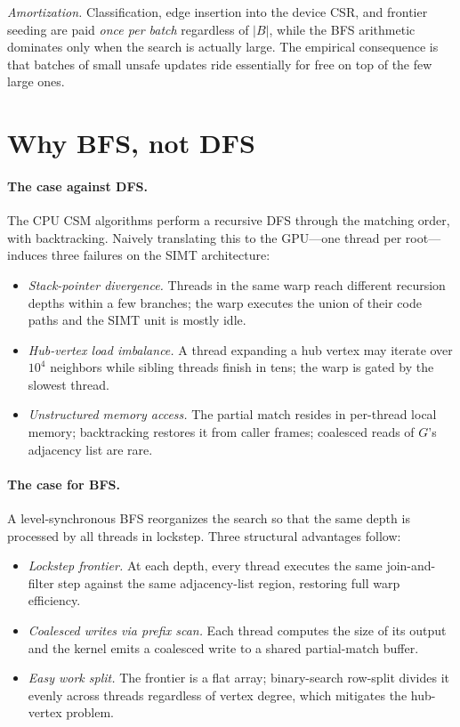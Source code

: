 \documentclass[sigconf,nonacm]{acmart}
\theoremstyle{definition}
\begin{document}
\noindent\emph{Amortization.} Classification, edge insertion into the device CSR, and frontier seeding are paid \emph{once per batch} regardless of $|B|$, while the BFS arithmetic dominates only when the search is actually large. The empirical consequence is that batches of small unsafe updates ride essentially for free on top of the few large ones.

\section{Why BFS, not DFS}
\label{sec:bfs-vs-dfs}

\paragraph{The case against DFS.}
The CPU CSM algorithms perform a recursive DFS through the matching order, with backtracking. Naively translating this to the GPU---one thread per root---induces three failures on the SIMT architecture:

\begin{itemize}
    \item \emph{Stack-pointer divergence.} Threads in the same warp reach different recursion depths within a few branches; the warp executes the union of their code paths and the SIMT unit is mostly idle.
    \item \emph{Hub-vertex load imbalance.} A thread expanding a hub vertex may iterate over $10^4$ neighbors while sibling threads finish in tens; the warp is gated by the slowest thread.
    \item \emph{Unstructured memory access.} The partial match resides in per-thread local memory; backtracking restores it from caller frames; coalesced reads of $G$'s adjacency list are rare.
\end{itemize}

\paragraph{The case for BFS.}
A level-synchronous BFS reorganizes the search so that the same depth is processed by all threads in lockstep. Three structural advantages follow:

\begin{itemize}
    \item \emph{Lockstep frontier.} At each depth, every thread executes the same join-and-filter step against the same adjacency-list region, restoring full warp efficiency.
    \item \emph{Coalesced writes via prefix scan.} Each thread computes the size of its output and the kernel emits a coalesced write to a shared partial-match buffer.
    \item \emph{Easy work split.} The frontier is a flat array; binary-search row-split divides it evenly across threads regardless of vertex degree, which mitigates the hub-vertex problem.
\end{itemize}
\end{document}
